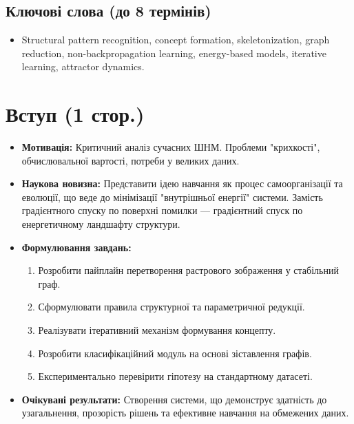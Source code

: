 \documentclass[12pt, a4paper]{article}
\begin{document}
\subsection*{Ключові слова (до 8 термінів)}
\begin{itemize}
    \item Structural pattern recognition, concept formation, skeletonization, graph reduction, non-backpropagation learning, energy-based models, iterative learning, attractor dynamics.
\end{itemize}

\section{Вступ (1 стор.)}
\begin{itemize}
    \item \textbf{Мотивація:} Критичний аналіз сучасних ШНМ. Проблеми "крихкості", обчислювальної вартості, потреби у великих даних.
    \item \textbf{Наукова новизна:} Представити ідею навчання як процес самоорганізації та еволюції, що веде до мінімізації "внутрішньої енергії" системи. Замість градієнтного спуску по поверхні помилки — градієнтний спуск по енергетичному ландшафту структури.
    \item \textbf{Формулювання завдань:}
    \begin{enumerate}
        \item Розробити пайплайн перетворення растрового зображення у стабільний граф.
        \item Сформулювати правила структурної та параметричної редукції.
        \item Реалізувати ітеративний механізм формування концепту.
        \item Розробити класифікаційний модуль на основі зіставлення графів.
        \item Експериментально перевірити гіпотезу на стандартному датасеті.
    \end{enumerate}
    \item \textbf{Очікувані результати:} Створення системи, що демонструє здатність до узагальнення, прозорість рішень та ефективне навчання на обмежених даних.
\end{itemize}
\end{document}
